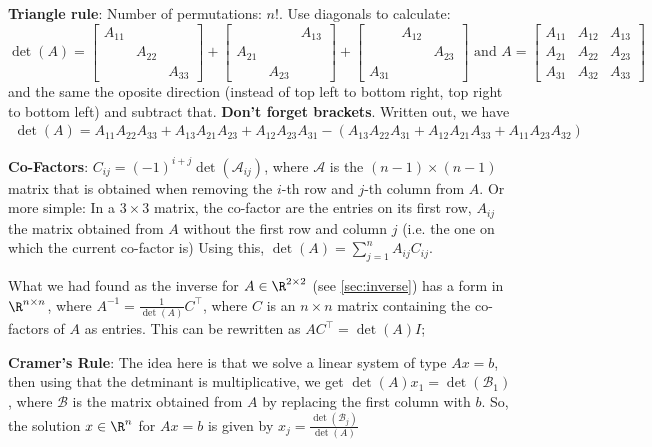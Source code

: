 \shortex \hspace{0mm} \textbf{Triangle rule}: Number of permutations: $n!$. Use diagonals to calculate:
\[
    \det(A) = \begin{bmatrix}
        A_{11} &        &        \\
               & A_{22} &        \\
               &        & A_{33}
    \end{bmatrix}+
    \begin{bmatrix}
               &        & A_{13} \\
        A_{21} &        &        \\
               & A_{23} &
    \end{bmatrix}+
    \begin{bmatrix}
               & A_{12} &        \\
               &        & A_{23} \\
        A_{31} &        &
    \end{bmatrix}
    \text{ and } A = \begin{bmatrix}
        A_{11} & A_{12} & A_{13} \\
        A_{21} & A_{22} & A_{23} \\
        A_{31} & A_{32} & A_{33}
    \end{bmatrix}
\]
and the same the oposite direction (instead of top left to bottom right, top right to bottom left) and subtract that.
\textbf{Don't forget brackets}. Written out, we have
\begin{align*}
    \det(A) = A_{11} A_{22} A_{33} + A_{13} A_{21} A_{23} + A_{12} A_{23} A_{31} - (A_{13} A_{22} A_{31} + A_{12} A_{21} A_{33} + A_{11} A_{23} A_{32})
\end{align*}

\shortdef \textbf{Co-Factors}: $C_{ij} = (-1)^{i + j}\det(\mathscr{A}_{ij})$, where $\mathscr{A}$ is the $(n - 1) \times (n - 1)$ matrix that is obtained when removing the $i$-th row and $j$-th column from $A$. Or more simple: In a $3 \times 3$ matrix, the co-factor are the entries on its first row, $A_{ij}$ the matrix obtained from $A$ without the first row and column $j$ (i.e. the one on which the current co-factor is)
\shortproposition Using this, $\det(A) = \displaystyle\sum_{j = 1}^{n} A_{ij} C_{ij}$.

\shortproposition What we had found as the inverse for $A \in \R^{2 \times 2}$ (see \ref{sec:inverse}) has a form in $\R^{n \times n}$, where $A^{-1} = \frac{1}{\det(A)}C^{\top}$, where $C$ is an $n \times n$ matrix containing the co-factors of $A$ as entries. This can be rewritten as $AC^{\top} = \det(A)I$;

\setcounter{all}{19}\shortproposition \textbf{Cramer's Rule}: The idea here is that we solve a linear system of type $Ax = b$, then using that the detminant is multiplicative, we get $\det(A)x_1 = \det(\mathscr{B}_1)$, where $\mathscr{B}$ is the matrix obtained from $A$ by replacing the first column with $b$. So, the solution $x \in \R^n$ for $Ax = b$ is given by $x_j = \displaystyle \frac{\det(\mathscr{B}_j)}{\det(A)}$
